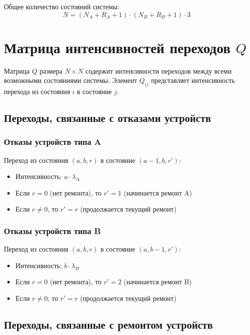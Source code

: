 \documentclass[12pt,a4paper]{article}
\begin{document}
Общее количество состояний системы:
\begin{equation}
    N = (N_A + R_A + 1) \cdot (N_B + R_B + 1) \cdot 3
\end{equation}

\section{Матрица интенсивностей переходов $Q$}

Матрица $Q$ размера $N \times N$ содержит интенсивности переходов между всеми возможными состояниями системы. Элемент $Q_{ij}$ представляет интенсивность перехода из состояния $i$ в состояние $j$.

\subsection{Переходы, связанные с отказами устройств}

\subsubsection{Отказы устройств типа A}

Переход из состояния $(a, b, r)$ в состояние $(a-1, b, r')$:
\begin{itemize}
    \item Интенсивность: $a \cdot \lambda_A$
    \item Если $r = 0$ (нет ремонта), то $r' = 1$ (начинается ремонт A)
    \item Если $r \neq 0$, то $r' = r$ (продолжается текущий ремонт)
\end{itemize}

\subsubsection{Отказы устройств типа B}

Переход из состояния $(a, b, r)$ в состояние $(a, b-1, r')$:
\begin{itemize}
    \item Интенсивность: $b \cdot \lambda_B$
    \item Если $r = 0$ (нет ремонта), то $r' = 2$ (начинается ремонт B)
    \item Если $r \neq 0$, то $r' = r$ (продолжается текущий ремонт)
\end{itemize}

\subsection{Переходы, связанные с ремонтом устройств}
\end{document}
